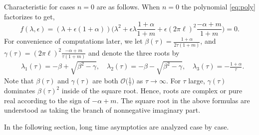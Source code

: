 \documentclass[a4paper,11pt]{article}
\def\l{(2\pi \ell)}
\theoremstyle{remark}
\begin{document}
Characteristic for cases $n=0$ are as follows. When $n=0$ the polynomial \eqref{eq:poly} factorizes to get,
$$ f(\lambda,\epsilon) = (\lambda +\epsilon(1+\alpha))\Big( \lambda^2 + \epsilon\lambda \frac{1+\alpha}{1+m} + \epsilon \l^2 \frac{-\alpha+m}{1+m}\Big)=0.$$
For convenience of computations later, we let $\beta(\tau) = \frac{1+\alpha}{2\tau(1+m)}$, and $\gamma(\tau)= \l^2\frac{-\alpha+m}{\tau(1+m)}$ and denote the three roots by
\begin{equation} \label{eq:inviscid_roots}
\begin{aligned}
 &\lambda_1(\tau) = -\beta + \sqrt{\beta^2-\gamma}, \quad \lambda_2(\tau) = -\beta - \sqrt{\beta^2-\gamma}, \quad \lambda_3(\tau) = -\frac{1+\alpha}{\tau}.
\end{aligned}
\end{equation}
Note that $\beta(\tau)$ and $\gamma(\tau)$ are both $\mathcal{O}\big(\frac{1}{\tau}\big)$ as $\tau \rightarrow \infty$. For $\tau$ large, $\gamma(\tau)$ dominates $\beta(\tau)^2$ inside of the square root. Hence, roots are complex or pure real according to the sign of $-\alpha+m$. The square root in the above formulas are understood as taking the branch of nonnegative imaginary part.

In the following section, long time asymptotics are analyzed case by case.
\end{document}
